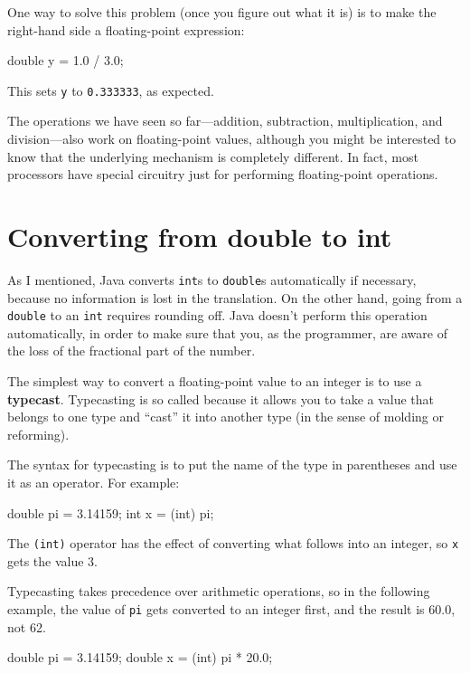 One way to solve this problem (once you figure out what it is) is to make the right-hand side a floating-point expression:

\begin{code}
    double y = 1.0 / 3.0;
\end{code}

This sets {\tt y} to {\tt 0.333333}, as expected.


The operations we have seen so far---addition, subtraction, multiplication, and division---also work on floating-point values, although you might be interested to know that the underlying mechanism is completely different.
In fact, most processors have special circuitry just for performing floating-point operations.


\section{Converting from double to int}
\label{rounding}

As I mentioned, Java converts {\tt int}s to {\tt double}s automatically if necessary, because no information is lost in the translation.
On the other hand, going from a {\tt double} to an {\tt int} requires rounding off.
Java doesn't perform this operation automatically, in order to make sure that you, as the programmer, are aware of the loss of the fractional part of the number.

The simplest way to convert a floating-point value to an integer is to use a {\bf typecast}.
Typecasting is so called because it allows you to take a value that belongs to one type and ``cast'' it into another type (in the sense of molding or reforming).

The syntax for typecasting is to put the name of the type in parentheses and use it as an operator.
For example:

\begin{code}
    double pi = 3.14159;
    int x = (int) pi;
\end{code}

The {\tt(int)} operator has the effect of converting what follows into an integer, so {\tt x} gets the value 3.

Typecasting takes precedence over arithmetic operations, so in the following example, the value of {\tt pi} gets converted to an integer first, and the result is 60.0, not 62.

\begin{code}
    double pi = 3.14159;
    double x = (int) pi * 20.0;
\end{code}

